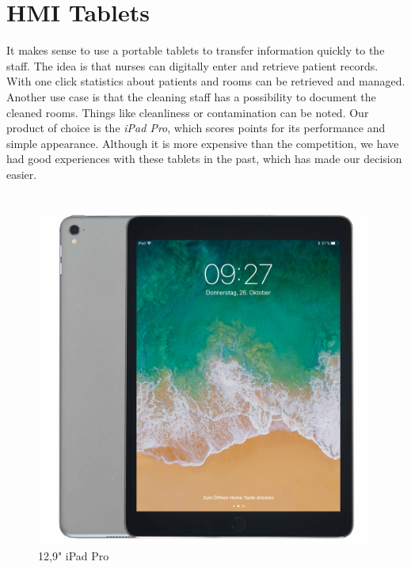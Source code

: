 \section{HMI Tablets}
It makes sense to use a portable tablets to transfer information quickly to the staff. The idea is that nurses can digitally enter and retrieve patient records. With one click statistics about patients and rooms can be retrieved and managed. Another use case is that the cleaning staff has a possibility to document the cleaned rooms. Things like cleanliness or contamination can be noted. Our product of choice is the \textit{iPad Pro}, which scores points for its performance and simple appearance. Although it is more expensive than the competition, we have had good experiences with these tablets in the past, which has made our decision easier.
\\
\\
\begin{figure}[h]
	\centering
	\includegraphics[width=.5\textwidth]{images/CostAnalysis/iPadPro} 
	\caption[12,9" iPad Pro]{12,9" iPad Pro\footnotemark}
	\label{fig:iPadPro}
\end{figure}
\clearpage
